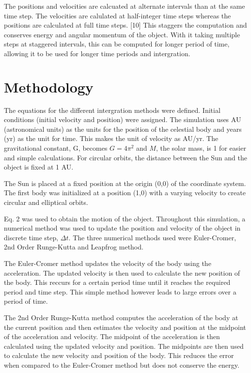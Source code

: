 \documentclass[12 pt, a4paper]{article}
\begin{document}
The positions and velocities are calcuated at alternate intervals than at the same time step. The velocities are calulated at half-integer time steps
whereas the positions are calculated at full time steps. [10] This staggers the computation and conserves energy and angular momentum of the object.
With it taking multiple steps at staggered intervals, this can be computed for longer period of time, allowing it to be used for longer time periods and intergration.

\section{Methodology}
The equations for the different intergration methods were defined. Initial conditions (initial velocity and position) were assigned.
The simulation uses AU (astronomical units) as the units for the position of the celestial body and years (yr) as the unit for time. This
makes the unit of velocity as AU/yr. The gravitational constant, G, becomes $G = 4 \pi^2$ and $M$, the solar mass, is 1 for easier and simple calculations. For circular orbits,
the distance between the Sun and the object is fixed at 1 AU.

The Sun is placed at a fixed position at the origin (0,0) of the coordinate system. The first body was initialized at a position (1,0) with a varying velocity to create circular and elliptical orbits.

Eq. 2 was used to obtain the motion of the object. Throughout this simulation, a numerical method was used to update the position and velocity of the object in discrete time step, $\Delta t$.
The three numerical methods used were Euler-Cromer, 2nd Order Runge-Kutta and Leapfrog method.

The Euler-Cromer method updates the velocity of the body using the acceleration. The updated velocity is then used to calculate the new position of the body. This reccurs for a certain period
time until it reaches the required period and time step. This simple method however leads to large errors over a period of time.

The 2nd Order Runge-Kutta method computes the acceleration of the body at the current position and then estimates the velocity and position at the midpoint of the acceleration and velocity.
The midpoint of the acceleration is then calculated using the updated velocity and position. The midpoints are then used to calculate the new velocity and position of the body. This reduces the error
when compared to the Euler-Cromer method but does not conserve the energy.
\end{document}
